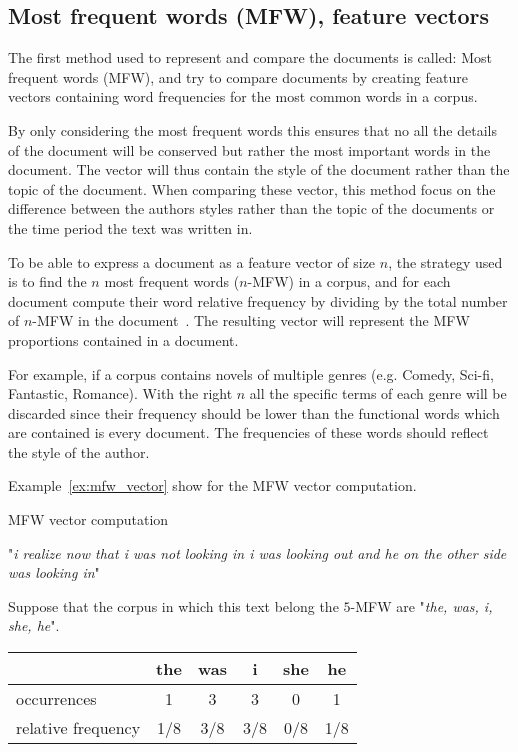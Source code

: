 \subsection{Most frequent words (MFW), feature vectors}

The first method used to represent and compare the documents is called: Most frequent words (MFW), and try to compare documents by creating feature vectors containing word frequencies for the most common words in a corpus.

By only considering the most frequent words this ensures that no all the details of the document will be conserved but rather the most important words in the document.
The vector will thus contain the style of the document rather than the topic of the document.
When comparing these vector, this method focus on the difference between the authors styles rather than the topic of the documents or the time period the text was written in.

To be able to express a document as a feature vector of size $n$, the strategy used is to find the $n$ most frequent words ($n$-MFW) in a corpus, and for each document compute their word relative frequency by dividing by the total number of $n$-MFW in the document~\cite{savoy_stylo}.
The resulting vector will represent the MFW proportions contained in a document.

For example, if a corpus contains novels of multiple genres (e.g. Comedy, Sci-fi, Fantastic, Romance).
With the right $n$ all the specific terms of each genre will be discarded since their frequency should be lower than the functional words which are contained is every document.
The frequencies of these words should reflect the style of the author.

Example~\ref{ex:mfw_vector} show for the MFW vector computation.

\begin{example}
  \centering
  \caption{MFW vector computation}
  \label{ex:mfw_vector}

  \begin{subexample}{\linewidth}
    "\textit{i realize now that i was not looking in i was looking out and he on the other side was looking in}"\cite{ddlc}
  \end{subexample}

  \vspace{0.5cm}

  \begin{subexample}{\linewidth}
    Suppose that the corpus in which this text belong the $5$-MFW are "\textit{the, was, i, she, he}".

    \centering
    \begin{tabular}{l c c c c c}
      \toprule
                       & the & was & i   & she & he  \\
      \midrule
      occurrences         & 1   & 3   & 3   & 0   & 1   \\
      relative frequency & 1/8 & 3/8 & 3/8 & 0/8 & 1/8 \\
      \bottomrule
    \end{tabular}
  \end{subexample}
\end{example}

